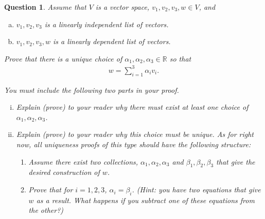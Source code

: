 \documentclass[12pt]{article}
\newtheorem{question}[thm]{Question}
\def\real{{\mathbb R}}
\def\al{\alpha}
\begin{document}
\vspace{1cm}




\begin{question}
    \normalfont

    Assume that $V$ is a vector space, $v_1,v_2,v_3,w\in V$, and
    \begin{enumerate}[(a)]
        \item $v_1,v_2,v_3$ \hspace{.1cm} is a linearly independent list of vectors.
        \item $v_1,v_2,v_3,w$ \hspace{.1cm}  is a linearly dependent list of vectors.
    \end{enumerate}
    Prove that there is a unique choice of $\al_1,\al_2,\al_3\in\real$ so that
    \begin{align*}
        w=\sum_{i=1}^3 \al_iv_i.
    \end{align*}


    You must include the following two parts in your proof.
    \begin{enumerate}[(i)]
        \item   Explain (prove) to your reader why there must exist at least one choice of $\al_1,\al_2,\al_3$.

        \item   Explain (prove) to your reader why this choice must be unique.  As for right now, all uniqueness proofs of this type should have the following structure:

              \begin{enumerate}[(1)]
                  \item Assume there exist two collections, $\al_1,\al_2,\al_3$ and $\beta_1,\beta_2,\beta_3$ that give the desired construction of $w$.
                  \item  Prove that for $i=1,2,3$, $\al_i=\beta_i$. (Hint: you have two equations that give $w$ as a result. What happens if you subtract one of these equations from the other?)

              \end{enumerate}
    \end{enumerate}



\end{question}

\vspace{1cm}
\end{document}
